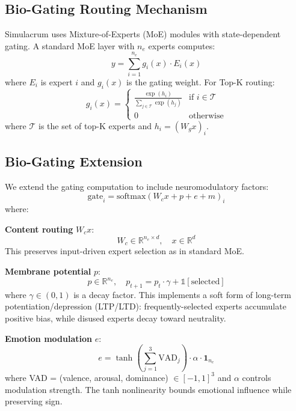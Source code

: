 \documentclass[preprint,12pt]{elsarticle}
\newcommand{\R}{\mathbb{R}}
\newcommand{\indicator}{\mathbb{1}}
\begin{document}
\subsection{Bio-Gating Routing Mechanism}

Simulacrum uses Mixture-of-Experts (MoE) modules with state-dependent gating. A standard MoE layer with $n_e$ experts computes:
\begin{equation}
y = \sum_{i=1}^{n_e} g_i(x) \cdot E_i(x)
\end{equation}
where $E_i$ is expert $i$ and $g_i(x)$ is the gating weight. For Top-K routing:
\begin{equation}
g_i(x) = \begin{cases}
\frac{\exp(h_i)}{\sum_{j \in \mathcal{T}} \exp(h_j)} & \text{if } i \in \mathcal{T} \\
0 & \text{otherwise}
\end{cases}
\end{equation}
where $\mathcal{T}$ is the set of top-K experts and $h_i = (W_g x)_i$.

\subsection{Bio-Gating Extension}

We extend the gating computation to include neuromodulatory factors:
\begin{equation}
\text{gate}_i = \text{softmax}(W_c x + p + e + m)_i
\end{equation}
where:

\textbf{Content routing} $W_c x$:
\begin{equation}
W_c \in \R^{n_e \times d}, \quad x \in \R^d
\end{equation}
This preserves input-driven expert selection as in standard MoE.

\textbf{Membrane potential} $p$:
\begin{equation}
p \in \R^{n_e}, \quad p_{t+1} = p_t \cdot \gamma + \indicator[\text{selected}]
\end{equation}
where $\gamma \in (0,1)$ is a decay factor. This implements a soft form of long-term potentiation/depression (LTP/LTD): frequently-selected experts accumulate positive bias, while disused experts decay toward neutrality.

\textbf{Emotion modulation} $e$:
\begin{equation}
e = \tanh\left(\sum_{j=1}^{3} \text{VAD}_j\right) \cdot \alpha \cdot \mathbf{1}_{n_e}
\end{equation}
where VAD = (valence, arousal, dominance) $\in [-1,1]^3$ and $\alpha$ controls modulation strength. The tanh nonlinearity bounds emotional influence while preserving sign.
\end{document}
